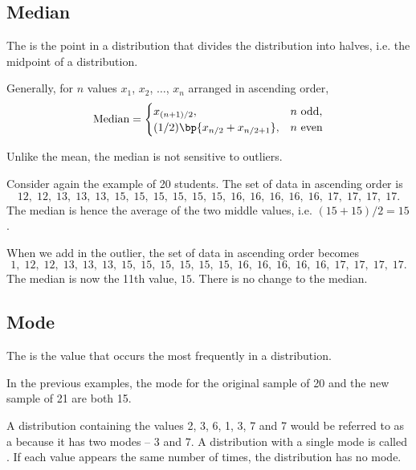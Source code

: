 \subsection{Median}

\begin{definition}
    The  is the point in a distribution that divides the distribution into halves, i.e. the midpoint of a distribution.
\end{definition}

Generally, for $n$ values $x_1$, $x_2$, $\dots$, $x_n$ arranged in ascending order, \[\text{Median} = \begin{cases}
    x_{(n+1)/2}, & \text{$n$ odd},\\
    (1/2) \bp{x_{n/2} + x_{n/2 + 1}}, & \text{$n$ even}
\end{cases}\]

Unlike the mean, the median is not sensitive to outliers.

\begin{example}[Median]
    Consider again the example of 20 students. The set of data in ascending order is \[12, \; 12, \; 13, \; 13, \; 13, \; 15, \; 15, \; 15, \; 15, \; 15, \; 15, \; 16, \; 16, \; 16, \; 16, \; 16, \; 17, \; 17, \; 17, \; 17.\] The median is hence the average of the two middle values, i.e. $(15 + 15)/2 = 15$.

    When we add in the outlier, the set of data in ascending order becomes \[1, \; 12, \; 12, \; 13, \; 13, \; 13, \; 15, \; 15, \; 15, \; 15, \; 15, \; 15, \; 16, \; 16, \; 16, \; 16, \; 16, \; 17, \; 17, \; 17, \; 17.\] The median is now the 11th value, $15$. There is no change to the median.
\end{example}

\subsection{Mode}

\begin{definition}
    The  is the value that occurs the most frequently in a distribution.
\end{definition}

In the previous examples, the mode for the original sample of 20 and the new sample of 21 are both 15.

A distribution containing the values 2, 3, 6, 1, 3, 7 and 7 would be referred to as a  because it has two modes -- 3 and 7. A distribution with a single mode is called . If each value appears the same number of times, the distribution has no mode.

